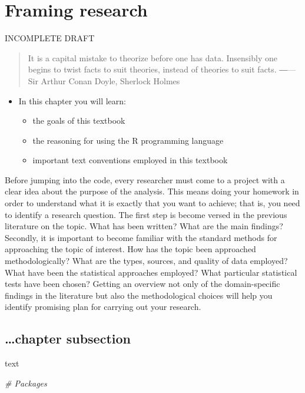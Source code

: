 \documentclass[
]{article}
\newenvironment{Shaded}{\begin{snugshade}}{\end{snugshade}}
\newcommand{\CommentTok}[1]{\textcolor[rgb]{0.56,0.35,0.01}{\textit{#1}}}
\providecommand{\tightlist}{%
  \setlength{\itemsep}{0pt}\setlength{\parskip}{0pt}}
\newenvironment{rmdblock}[1]
  {\begin{shaded*}
  \begin{itemize}
  \renewcommand{\labelitemi}{
    \raisebox{-.5\height}[0pt][0pt]{
      {\setkeys{Gin}{width=2em,keepaspectratio}\texttt{[image: assets/images/\#1]}}
    }
  }
  \item
  }
  {
  \end{itemize}
  \end{shaded*}
  }
\newenvironment{rmdkey}
  {\begin{rmdblock}{key}}
  {\end{rmdblock}}
\begin{document}
\hypertarget{framing-research}{%
\section{Framing research}\label{framing-research}}

INCOMPLETE DRAFT

\begin{quote}
It is a capital mistake to theorize before one has data. Insensibly one begins to twist facts to suit theories, instead of theories to suit facts.
―---Sir Arthur Conan Doyle, Sherlock Holmes
\end{quote}

\begin{rmdkey}
In this chapter you will learn:

\begin{itemize}
\tightlist
\item
  the goals of this textbook
\item
  the reasoning for using the R programming language
\item
  important text conventions employed in this textbook
\end{itemize}
\end{rmdkey}

Before jumping into the code, every researcher must come to a project with a clear idea about the purpose of the analysis. This means doing your homework in order to understand what it is exactly that you want to achieve; that is, you need to identify a research question. The first step is become versed in the previous literature on the topic. What has been written? What are the main findings? Secondly, it is important to become familiar with the standard methods for approaching the topic of interest. How has the topic been approached methodologically? What are the types, sources, and quality of data employed? What have been the statistical approaches employed? What particular statistical tests have been chosen? Getting an overview not only of the domain-specific findings in the literature but also the methodological choices will help you identify promising plan for carrying out your research.

\hypertarget{chapter-subsection}{%
\subsection{\ldots chapter subsection}\label{chapter-subsection}}

text

\begin{Shaded}
\begin{Highlighting}[]
\CommentTok{\# Packages}
\end{Highlighting}
\end{Shaded}
\end{document}
